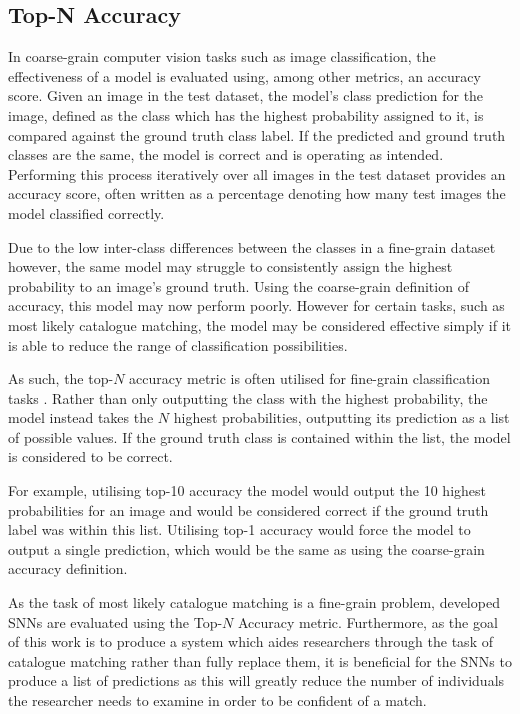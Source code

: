 \subsection{Top-N Accuracy}\label{ch:ID,sec:SNNBackground,subsec:TopNAccuracy}

In coarse-grain computer vision tasks such as image classification, the effectiveness of a model is evaluated using, among other metrics, an accuracy score. Given an image in the test dataset, the model's class prediction for the image, defined as the class which has the highest probability assigned to it, is compared against the ground truth class label. If the predicted and ground truth classes are the same, the model is correct and is operating as intended. Performing this process iteratively over all images in the test dataset provides an accuracy score, often written as a percentage denoting how many test images the model classified correctly.

Due to the low inter-class differences between the classes in a fine-grain dataset however, the same model may struggle to consistently assign the highest probability to an image's ground truth. Using the coarse-grain definition of accuracy, this model may now perform poorly. However for certain tasks, such as most likely catalogue matching, the model may be considered effective simply if it is able to reduce the range of classification possibilities.

As such, the top-$N$ accuracy metric is often utilised for fine-grain classification tasks \cite{yang_large-scale_2015, gao_towards_2021, brust_towards_2017}. Rather than only outputting the class with the highest probability, the model instead takes the $N$ highest probabilities, outputting its prediction as a list of possible values. If the ground truth class is contained within the list, the model is considered to be correct. 

For example, utilising top-10 accuracy the model would output the 10 highest probabilities for an image and would be considered correct if the ground truth label was within this list. Utilising top-1 accuracy would force the model to output a single prediction, which would be the same as using the coarse-grain accuracy definition. 

As the task of most likely catalogue matching is a fine-grain problem, developed SNNs are evaluated using the Top-$N$ Accuracy metric. Furthermore, as the goal of this work is to produce a system which aides researchers through the task of catalogue matching rather than fully replace them, it is beneficial for the SNNs to produce a list of predictions as this will greatly reduce the number of individuals the researcher needs to examine in order to be confident of a match.

